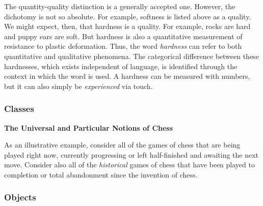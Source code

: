 The quantity-quality distinction is a generally accepted one. However, the dichotomy is not so absolute. For example, softness is listed above as a quality. We might expect, then, that hardness is a quality. For example, rocks are hard and puppy ears are soft. But hardness is also a quantitative measurement of resistance to plastic deformation. Thus, the word \textit{hardness} can refer to both quantitative and qualitative phenomena. The categorical difference between these hardnesses, which exists independent of language, is identified through the context in which the word is used. A hardness can be measured with numbers, but it can also simply be \textit{experienced} via touch. \\


\subsubsection{Classes}

\begin{tcolorbox}[breakable, enhanced, colback=textbook-blue, sharp corners]
	\vspace{3mm}
	\begin{center}
		\textbf{The Universal and Particular Notions of Chess}
	\end{center}
	
	As an illustrative example, consider all of the games of chess that are being played right now, currently progressing or left half-finished and awaiting the next move. Consider also all of the \textit{historical} games of chess that have been played to completion or total abandonment since the invention of chess. \\
	\vspace{3mm}
\end{tcolorbox}
\vspace{2\baselineskip}

\subsubsection{Objects}

